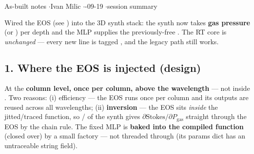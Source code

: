 


%
{As-built notes \quad$\cdot$\quad Ivan Milic \quad$\cdot$-09-19 \quad$\cdot$\quad session summary}

Wired the  EOS (see ) into the 3D synth stack: the synth
now takes \textbf{gas pressure}  (or ) per depth and the MLP supplies the previously-free
. The RT core is \emph{unchanged} --- every new line is tagged , and the
legacy  path still works.

\subsection*{1. Where the EOS is injected (design)}
At the \textbf{column level, once per column, above the wavelength } --- not inside
. Two reasons: (i) efficiency --- the EOS runs once per column and its
 outputs are reused across all wavelengths; (ii) \textbf{inversion} --- the EOS sits
\emph{inside} the jitted/traced function, so / of the synth gives
$\partial\text{Stokes}/\partial P_\mathrm{gas}$ straight through the EOS by the chain rule. The fixed MLP
is \textbf{baked into the compiled function} (closed over) by a small factory --- not threaded through
 (its params dict has an untraceable string field).

